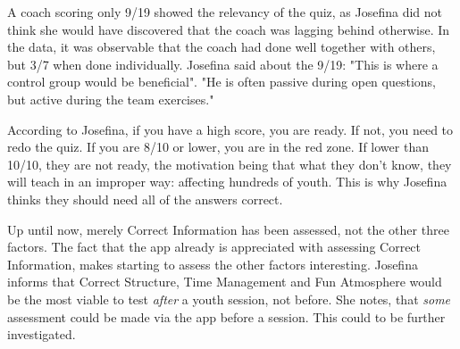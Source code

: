 A coach scoring only 9/19 showed the relevancy of the quiz, as Josefina did not think she would have discovered that the coach was lagging behind otherwise. In the data, it was observable that the coach had done well together with others, but 3/7 when done individually. Josefina said about the 9/19: "This is where a control group would be beneficial". "He is often passive during open questions, but active during the team exercises."

According to Josefina, if you have a high score, you are ready. If not, you need to redo the quiz. If you are 8/10 or lower, you are in the red zone. If lower than 10/10, they are not ready, the motivation being that what they don't know, they will teach in an improper way: affecting hundreds of youth. This is why Josefina thinks they should need all of the answers correct.

Up until now, merely Correct Information has been assessed, not the other three factors. The fact that the app already is appreciated with assessing Correct Information, makes starting to assess the other factors interesting. Josefina informs that Correct Structure, Time Management and Fun Atmosphere would be the most viable to test \textit{after} a youth session, not before. She notes, that \textit{some} assessment could be made via the app before a session. This could to be further investigated.
